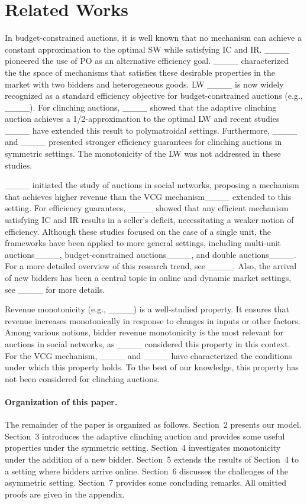\section{Related Works}
In budget-constrained auctions, 
it is well known that no mechanism can achieve a constant approximation to the optimal SW while satisfying IC and IR. 
____ pioneered the use of PO as an alternative efficiency goal. 
____ characterized the the space of mechanisms that satisfies these desirable properties 
in the market with two bidders and heterogeneous goods. 
LW ____ is now widely recognized as a standard efficiency objective for budget-constrained auctions (e.g., ____).
For clinching auctions, ____ showed that the adaptive clinching auction achieves a 1/2-approximation to the optimal LW and recent studies ____ have extended this result to polymatroidal settings. Furthermore,  ____ and ____ presented stronger efficiency guarantees for clinching auctions in symmetric settings. The monotonicity of the LW was not addressed in these studies.

____ initiated the study of auctions in social networks, proposing a mechanism that achieves higher revenue than the VCG mechanism____ extended to this setting. For efficiency guarantees, ____ showed that any efficient mechanism satisfying IC and IR results in a seller's deficit, necessitating a weaker notion of efficiency. Although these studies focused on the case of a single unit, the frameworks have been applied to more general settings, including multi-unit auctions____, budget-constrained auctions____, and double auctions____. For a more detailed overview of this research trend, see ____. Also, 
the arrival of new bidders has been a central topic in online and dynamic market settings, 
see ____ for more details.

Revenue monotonicity (e.g., ____) is a well-studied property.  
It ensures that revenue increases monotonically in response to changes in inputs or other factors.  
Among various notions, bidder revenue monotonicity is the most relevant for auctions in social networks,  
as ____ considered this property in this context.  
For the VCG mechanism, ____ and ____ have characterized  
the conditions under which this property holds.  
To the best of our knowledge, this property has not been considered for clinching auctions.






\paragraph{Organization of this paper.}
The remainder of the paper is organized as follows.  
Section~2 presents our model.  
Section~3 introduces the adaptive clinching auction and provides some useful properties under the symmetric setting.  
Section~4 investigates monotonicity under the addition of a new bidder.  
Section~5 extends the results of Section~4 to a setting where bidders arrive online.  
Section~6 discusses the challenges of the asymmetric setting.  
Section~7 provides some concluding remarks.  
All omitted proofs are given in the appendix.



